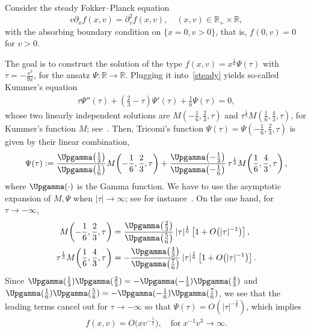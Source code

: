 \documentclass[10pt]{amsart}
\theoremstyle{definition}\newtheorem{defi}[theo]{Definition}\newtheorem{rema}[theo]{Remark}\newtheorem{exam}[theo]{Example}\newtheorem{exem}[theo]{Example}\newtheorem{nota}[theo]{Notation}
\newcommand*\p{\partial}
\newcommand*\R {\mathbb{R}}
\begin{document}
Consider the steady Fokker--Planck equation
\begin{equation}\label{steady}
v\p_xf(x,v)=\p_v^2f(x,v),\quad (x,v)\in\R_+\times\R,
\end{equation}
with the absorbing boundary condition on $\{x=0,v>0\}$, that is, $f(0,v)=0$ for $v>0$.

The goal is to construct the solution of the type $f(x,v)=x^\frac{1}{6}\Psi(\tau)$ with $\tau=-\frac{v^3}{9x}$, for the ansatz $\Psi:\R\rightarrow\R$. Plugging it into~\eqref{steady} yields so-called Kummer's equation
\begin{align*}
\tau\Psi''(\tau)+\left(\frac{2}{3}-\tau\right)\Psi'(\tau)+\frac{1}{6}\Psi(\tau)=0,
\end{align*}
whose two linearly independent solutions are $M(-\frac{1}{6},\frac{2}{3},\tau)$ and $\tau^\frac{1}{3} M(\frac{1}{6},\frac{4}{3},\tau)$, for Kummer's function $M$; see~\cite[Chapter~6]{Wangzhuxi}. Then, Tricomi's function $\Psi(\tau)=\Psi(-\frac{1}{6},\frac{2}{3},\tau)$ is given by their linear combination,
\begin{equation}\label{Tricomi}
\Psi(\tau):=\frac{\Upgamma\!\left(\frac{1}{3}\right)}{\Upgamma\!\left(\frac{1}{6}\right)} M\!\left(-\frac{1}{6},\frac{2}{3},\tau\right) + \frac{\Upgamma\!\left(-\frac{1}{3}\right)}{\Upgamma\!\left(-\frac{1}{6}\right)}\, \tau^\frac{1}{3} M\!\left(\frac{1}{6},\frac{4}{3},\tau\right),
\end{equation}
where $\Upgamma(\cdot)$ is the Gamma function. We have to use the asymptotic expansion of $M,\Psi$ when $|\tau|\rightarrow\infty$; see for instance~\cite[Section~6.6]{Wangzhuxi}. On the one hand, for $\tau\rightarrow-\infty$,
\begin{align*}
M\!\left(-\frac{1}{6},\frac{2}{3},\tau\right) &= \frac{\Upgamma\!\left(\frac{2}{3}\right)}{\Upgamma\!\left(\frac{5}{6}\right)}
\,|\tau|^\frac{1}{6} \left[1+O\!\left(|\tau|^{-1}\right)\right], \\
\tau^\frac{1}{3} M\!\left(\frac{1}{6},\frac{4}{3},\tau\right) &=- \frac{\Upgamma\!\left(\frac{4}{3}\right)}{\Upgamma\!\left(\frac{7}{6}\right)}
\,|\tau|^{\frac{1}{6}} \left[1+O\!\left(|\tau|^{-1}\right)\right].
\end{align*}
Since $\Upgamma(\frac{1}{3})\Upgamma(\frac{2}{3})=-\Upgamma(-\frac{1}{3})\Upgamma(\frac{4}{3})$ and $\Upgamma(\frac{1}{6})\Upgamma(\frac{5}{6})=-\Upgamma(-\frac{1}{6})\Upgamma(\frac{7}{6})$, we see that the leading terms cancel out for $\tau\rightarrow-\infty$ so that $\Psi(\tau)=O(|\tau|^{-\frac{5}{6}})$, which implies
\begin{align*}
f(x,v)=O\big(xv^{-\frac{5}{2}}\big),\quad\text{for}\; x^{-1}{v^3}\rightarrow\infty.
\end{align*}
\end{document}
